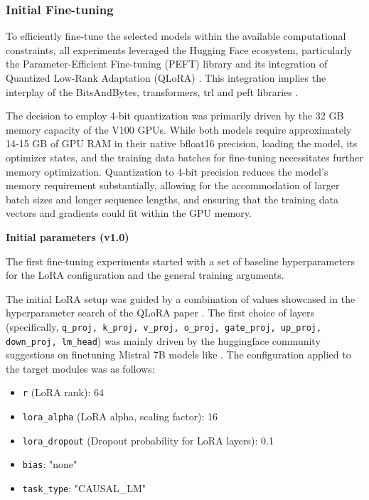 \subsubsection{Initial Fine-tuning}

To efficiently fine-tune the selected models within the available computational constraints, all experiments leveraged the Hugging Face ecosystem, particularly the Parameter-Efficient Fine-tuning (PEFT) library \cite{peft} and its integration of Quantized Low-Rank Adaptation (QLoRA) \cite{dettmers2023qlora}.
This integration implies the interplay of the BitsAndBytes, transformers, trl and peft libraries \cite{hf_blog_4bit_qlora_2023}.

The decision to employ 4-bit quantization was primarily driven by the 32 GB memory capacity of the V100 GPUs.
While both models require approximately 14-15 GB of GPU RAM in their native bfloat16 precision, loading the model, its optimizer states, and the training data batches for fine-tuning necessitates further memory optimization.
Quantization to 4-bit precision reduces the model's memory requirement substantially, allowing for the accommodation of larger batch sizes and longer sequence lengths, and ensuring that the training data vectors and gradients could fit within the GPU memory.

\textbf{Initial parameters (v1.0)}

The first fine-tuning experiments started with a set of baseline hyperparameters for the LoRA configuration and the general training arguments.

The initial LoRA setup was guided by a combination of values showcased in the hyperparameter search of the QLoRA paper \cite{dettmers2023qlora}.
The first choice of layers  (specifically, \texttt{q\_proj, k\_proj, v\_proj, o\_proj, gate\_proj, up\_proj, down\_proj, lm\_head}) was mainly driven by the huggingface community suggestions on finetuning Mistral 7B models like \cite{roggendorff2024finetuning}.
The configuration applied to the target modules was as follows:
\begin{itemize}
    \item \texttt{r} (LoRA rank): 64
    \item \texttt{lora\_alpha} (LoRA alpha, scaling factor): 16
    \item \texttt{lora\_dropout} (Dropout probability for LoRA layers): 0.1
    \item \texttt{bias}: "none"
    \item \texttt{task\_type}: "CAUSAL\_LM"
\end{itemize}

